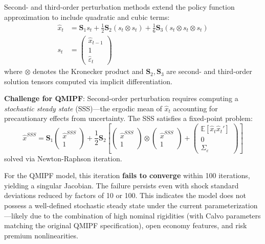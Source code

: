 \documentclass[12pt]{article}
\begin{document}
Second- and third-order perturbation methods extend the policy function approximation to include quadratic and cubic terms:
\begin{align}
\hat{x}_t &= \mathbf{S}_1 s_t + \frac{1}{2} \mathbf{S}_2 (s_t \otimes s_t) + \frac{1}{6} \mathbf{S}_3 (s_t \otimes s_t \otimes s_t) \\
s_t &= \begin{pmatrix} \hat{x}_{t-1} \\ 1 \\ \hat{\varepsilon}_t \end{pmatrix}
\end{align}
where $\otimes$ denotes the Kronecker product and $\mathbf{S}_2, \mathbf{S}_3$ are second- and third-order solution tensors computed via implicit differentiation.

\textbf{Challenge for QMIPF}: Second-order perturbation requires computing a \emph{stochastic steady state} (SSS)---the ergodic mean of $\hat{x}_t$ accounting for precautionary effects from uncertainty. The SSS satisfies a fixed-point problem:
\begin{equation}
\hat{x}^{SSS} = \mathbf{S}_1 \begin{pmatrix} \hat{x}^{SSS} \\ 1 \end{pmatrix} + \frac{1}{2} \mathbf{S}_2 \left[ \begin{pmatrix} \hat{x}^{SSS} \\ 1 \end{pmatrix} \otimes \begin{pmatrix} \hat{x}^{SSS} \\ 1 \end{pmatrix} + \begin{pmatrix} \mathbb{E}[\hat{x}_t \hat{x}_t'] \\ 0 \\ \Sigma_\varepsilon \end{pmatrix} \right]
\end{equation}
solved via Newton-Raphson iteration.

For the QMIPF model, this iteration \textbf{fails to converge} within 100 iterations, yielding a singular Jacobian. The failure persists even with shock standard deviations reduced by factors of 10 or 100. This indicates the model does not possess a well-defined stochastic steady state under the current parameterization---likely due to the combination of high nominal rigidities (with Calvo parameters matching the original QMIPF specification), open economy features, and risk premium nonlinearities.
\end{document}
